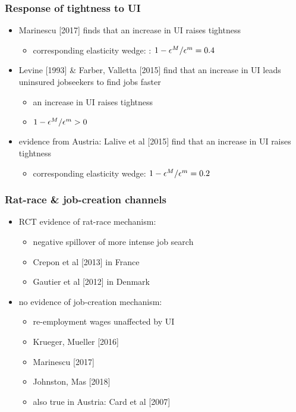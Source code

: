\documentclass[12pt,xcolor={dvipsnames},hyperref={pdftex,pdfpagemode=UseNone,hidelinks,pdfdisplaydoctitle=true},usepdftitle=false]{beamer}
\begin{document}
\begin{frame}
\frametitle{Response of tightness to UI}
\begin{itemize}
\item Marinescu [2017] finds that an increase in UI raises tightness
\begin{itemize}
\item corresponding elasticity wedge: : $1-\epsilon^{M}/\epsilon^{m}=0.4$
\end{itemize}
\item Levine [1993] \& Farber, Valletta [2015] find that an increase in UI leads uninsured jobseekers to find jobs faster
\begin{itemize}
\item[\then] an increase in UI raises tightness
\item[\then] $1-\epsilon^M/\epsilon^m > 0 $
\end{itemize}
\item evidence from Austria: Lalive et al [2015] find that an increase in UI raises tightness
\begin{itemize}
\item corresponding elasticity wedge: $1-\epsilon^{M}/\epsilon^{m}=0.2$
\end{itemize}
\end{itemize}
\end{frame}

\begin{frame}
\frametitle{Rat-race \& job-creation channels}
\begin{itemize}
\item RCT evidence of rat-race mechanism:
\begin{itemize}
\item negative spillover of more intense job search  
\item Crepon et al [2013] in France
\item Gautier et al [2012] in Denmark 
\end{itemize}
\item no evidence of job-creation mechanism:
\begin{itemize}
\item re-employment wages unaffected by UI
\item Krueger, Mueller [2016]
\item Marinescu [2017]
\item Johnston, Mas [2018]
\item also true in Austria: Card et al [2007]
\end{itemize}
\end{itemize}
\end{frame}
\end{document}
